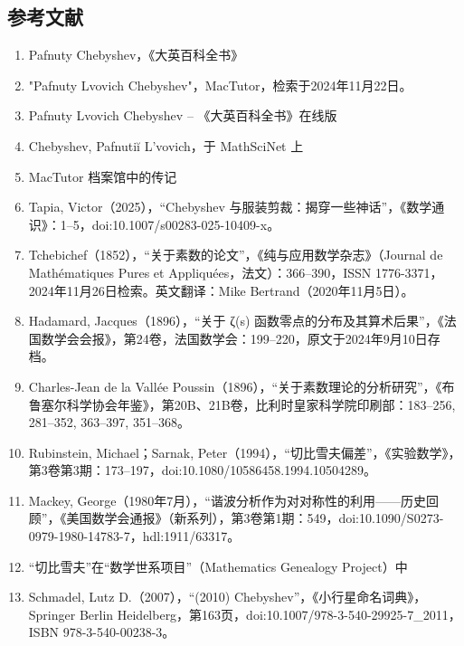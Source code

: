 \subsection{参考文献}
\begin{enumerate}
\item Pafnuty Chebyshev，《大英百科全书》
\item "Pafnuty Lvovich Chebyshev"，MacTutor，检索于2024年11月22日。
\item Pafnuty Lvovich Chebyshev – 《大英百科全书》在线版
\item Chebyshev, Pafnutiĭ L'vovich，于 MathSciNet 上
\item MacTutor 档案馆中的传记
\item Tapia, Victor（2025），“Chebyshev 与服装剪裁：揭穿一些神话”，《数学通识》：1–5，doi:10.1007/s00283-025-10409-x。
\item Tchebichef（1852），“关于素数的论文”，《纯与应用数学杂志》（Journal de Mathématiques Pures et Appliquées，法文）：366–390，ISSN 1776-3371，2024年11月26日检索。英文翻译：Mike Bertrand（2020年11月5日）。
\item Hadamard, Jacques（1896），“关于 ζ(s) 函数零点的分布及其算术后果”，《法国数学会会报》，第24卷，法国数学会：199–220，原文于2024年9月10日存档。
\item Charles-Jean de la Vallée Poussin（1896），“关于素数理论的分析研究”，《布鲁塞尔科学协会年鉴》，第20B、21B卷，比利时皇家科学院印刷部：183–256, 281–352, 363–397, 351–368。
\item Rubinstein, Michael；Sarnak, Peter（1994），“切比雪夫偏差”，《实验数学》，第3卷第3期：173–197，doi:10.1080/10586458.1994.10504289。
\item Mackey, George（1980年7月），“谐波分析作为对对称性的利用——历史回顾”，《美国数学会通报》（新系列），第3卷第1期：549，doi:10.1090/S0273-0979-1980-14783-7，hdl:1911/63317。
\item “切比雪夫”在“数学世系项目”（Mathematics Genealogy Project）中
\item Schmadel, Lutz D.（2007），“(2010) Chebyshev”，《小行星命名词典》，Springer Berlin Heidelberg，第163页，doi:10.1007/978-3-540-29925-7\_2011，ISBN 978-3-540-00238-3。
\end{enumerate}
